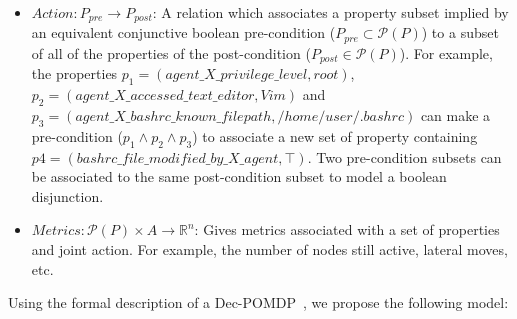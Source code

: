 \begin{itemize}
    \item $Action: P_{pre} \rightarrow P_{post}$: A relation which associates a property subset implied by an equivalent conjunctive boolean pre-condition ($P_{pre} \subset \mathcal{P}(P)$) to a subset of all of the properties of the post-condition ($P_{post} \in \mathcal{P}(P)$). For example, the properties $p_1 = (agent\_X\_privilege\_level, \allowbreak root)$, $p_2 = (agent\_X\_accessed\_text\_editor, \allowbreak Vim)$ and $p_3 = (agent\_X\_bashrc\_known\_filepath, \allowbreak /home/user/.bashrc)$ can make a pre-condition ($p_1 \land p_2 \land p_3$) to associate a new set of property containing $p4 = (bashrc\_file\_modified\_by\_X\_agent, \top)$. Two pre-condition subsets can be associated to the same post-condition subset to model a boolean disjunction.

    \item $Metrics: \mathcal{P}(P) \times A \rightarrow \mathbb{R}^{n}$: Gives metrics associated with a set of properties and joint action. For example, the number of nodes still active, lateral moves, etc.

\end{itemize}


Using the formal description of a Dec-POMDP~\cite{OliehoekA16}, we propose the following model:

